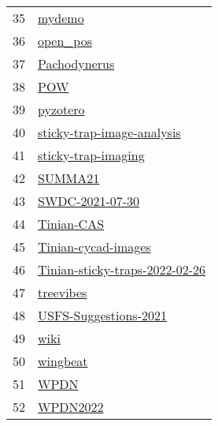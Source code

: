 \begin{longtable}{rl}
	35 &                                                           \href{https://github.com/aubreymoore/mydemo}{mydemo} \\
	36 &                                                       \href{https://github.com/aubreymoore/open_pos}{open\_pos} \\
	37 &                                               \href{https://github.com/aubreymoore/Pachodynerus}{Pachodynerus} \\
	38 &                                                                 \href{https://github.com/aubreymoore/POW}{POW} \\
	39 &                                                       \href{https://github.com/aubreymoore/pyzotero}{pyzotero} \\
	40 &                   \href{https://github.com/aubreymoore/sticky-trap-image-analysis}{sticky-trap-image-analysis} \\
	41 &                                 \href{https://github.com/aubreymoore/sticky-trap-imaging}{sticky-trap-imaging} \\
	42 &                                                         \href{https://github.com/aubreymoore/SUMMA21}{SUMMA21} \\
	43 &                                         \href{https://github.com/aubreymoore/SWDC-2021-07-30}{SWDC-2021-07-30} \\
	44 &                                                   \href{https://github.com/aubreymoore/Tinian-CAS}{Tinian-CAS} \\
	45 &                                 \href{https://github.com/aubreymoore/Tinian-cycad-images}{Tinian-cycad-images} \\
	46 &           \href{https://github.com/aubreymoore/Tinian-sticky-traps-2022-02-26}{Tinian-sticky-traps-2022-02-26} \\
	47 &                                                     \href{https://github.com/aubreymoore/treevibes}{treevibes} \\
	48 &                             \href{https://github.com/aubreymoore/USFS-Suggestions-2021}{USFS-Suggestions-2021} \\
	49 &                                                               \href{https://github.com/aubreymoore/wiki}{wiki} \\
	50 &                                                       \href{https://github.com/aubreymoore/wingbeat}{wingbeat} \\
	51 &                                                               \href{https://github.com/aubreymoore/WPDN}{WPDN} \\
	52 &                                                       \href{https://github.com/aubreymoore/WPDN2022}{WPDN2022} \\
\end{longtable}

